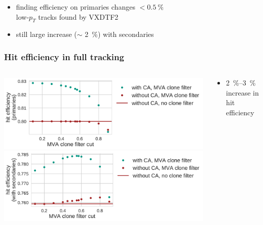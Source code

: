\documentclass[18pt, aspectratio=169]{beamer}
\begin{document}
\begin{frame}
\begin{columns}
\begin{column}{0.5\textwidth}
    \end{column}
  \end{columns}
  \begin{itemize}
  \item finding efficiency on primaries changes $< \SI{0.5}{\percent}$\\
    low-$p_T$ tracks found by VXDTF2
  \item still large increase ($\sim$ \SI{2}{\percent}) with secondaries
  \end{itemize}
\end{frame}

\begin{frame}
  \frametitle{Hit efficiency in full tracking}
  \begin{columns}
    \begin{column}{0.7\textwidth}
      \centering
      \includegraphics[width=1.0\textwidth]{figures/ca_hit_efficiency_primaries_fullreco.pdf}\\
    \includegraphics[width=1.0\textwidth]{figures/ca_hit_efficiency_with_secondaries_fullreco.pdf}\\
\end{column}
    \begin{column}{0.3\textwidth}
      \begin{itemize}
      \item \SI{2}{\percent}--\SI{3}{\percent} increase in hit efficiency
      \end{itemize}

    \end{column}
  \end{columns}
\end{frame}
\end{document}
